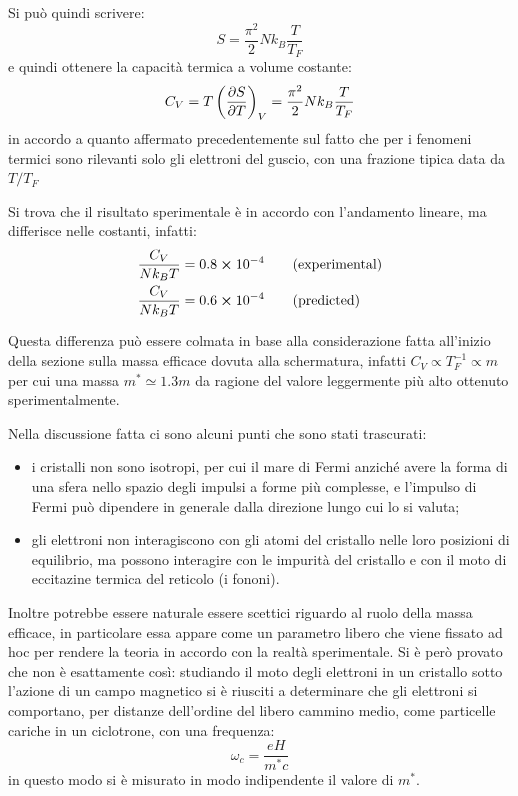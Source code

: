 Si può quindi scrivere:
\begin{equation*}
S = \frac{\pi^2}{2} N k_B \frac{T}{T_F}
\end{equation*}
e quindi ottenere la capacità termica a volume costante:
\begin{equation*}
C_V = T \left(\frac{\partial {S}}{\partial {T}}\right)_{V} = \frac{\pi^2}{2} N k_B \frac{T}{T_F}
\end{equation*}
in accordo a quanto affermato precedentemente sul fatto che per i fenomeni termici sono rilevanti solo gli elettroni del guscio, con una frazione tipica data da $T/T_F$

Si trova che il risultato sperimentale è in accordo con l'andamento lineare, ma differisce nelle costanti, infatti:
\begin{align*}
\frac{C_V}{N k_B T} &= 0.8 \cross 10^{-4} \qquad (\text{experimental})\\
\frac{C_V}{N k_B T} &= 0.6 \cross 10^{-4} \qquad (\text{predicted})
\end{align*}

Questa differenza può essere colmata in base alla considerazione fatta all'inizio della sezione sulla massa efficace dovuta alla schermatura, infatti $C_V \propto T_F^{-1} \propto m$ per cui una massa $m^\ast \simeq 1.3 m$ da ragione del valore leggermente più alto ottenuto sperimentalmente.
\newline

Nella discussione fatta ci sono alcuni punti che sono stati trascurati:
\begin{itemize}
	\item i cristalli non sono isotropi, per cui il mare di Fermi anziché avere la forma di una sfera nello spazio degli impulsi a forme più complesse, e l'impulso di Fermi può dipendere in generale dalla direzione lungo cui lo si valuta;
	\item gli elettroni non interagiscono con gli atomi del cristallo nelle loro posizioni di equilibrio, ma possono interagire con le impurità del cristallo e con il moto di eccitazine termica del reticolo (i fononi).
\end{itemize}
Inoltre potrebbe essere naturale essere scettici riguardo al ruolo della massa efficace, in particolare essa appare come un parametro libero che viene fissato ad hoc per rendere la teoria in accordo con la realtà sperimentale.
Si è però provato che non è esattamente così: studiando il moto degli elettroni in un cristallo sotto l'azione di un campo magnetico si è riusciti a determinare che gli elettroni si comportano, per distanze dell'ordine del libero cammino medio, come particelle cariche in un ciclotrone, con una frequenza:
\begin{equation*}
\omega_c = \frac{e H}{m^\ast c}
\end{equation*}
in questo modo si è misurato in modo indipendente il valore di $m^\ast$.

